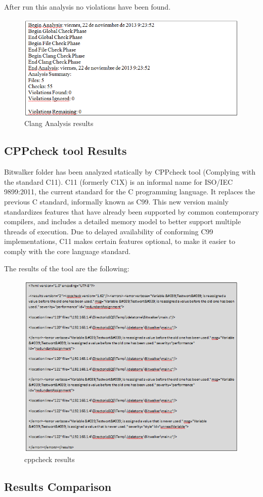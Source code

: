 After run this analysis no violations have been found.

\begin{figure}[H]
\centering
\includegraphics[scale=0.8]{./figures/clang.png}
\caption{Clang Analysis results}
\end{figure}

\subsection{CPPcheck tool Results}

Bitwalker folder has been analyzed statically by CPPcheck tool (Complying with the standard C11).
 C11 (formerly C1X) is an informal name for ISO/IEC 9899:2011, the current standard for the C programming language. It replaces the previous C standard, informally known as C99. This new version mainly standardizes features that have already been supported by common contemporary compilers, and includes a detailed memory model to better support multiple threads of execution. Due to delayed availability of conforming C99 implementations, C11 makes certain features optional, to make it easier to comply with the core language standard.
 
The results of the tool are the following:
\begin{figure}[H]
\centering
\includegraphics{./figures/cppcheck.png}
\caption{cppcheck results}
\end{figure}

\subsection{Results Comparison}
